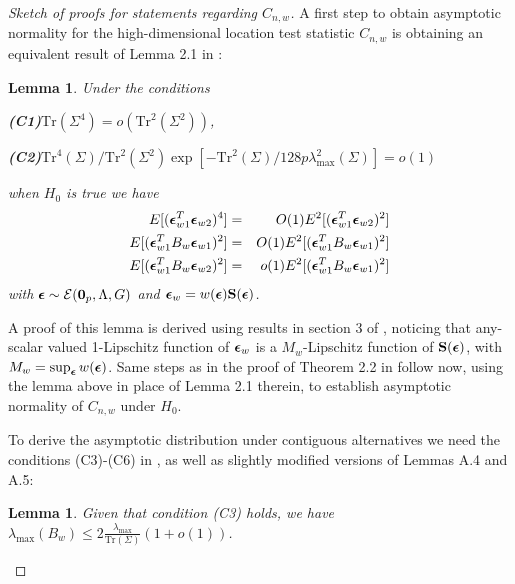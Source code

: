 \documentclass[12pt,letterpaper]{article}
\newtheorem{Lemma}[Theorem]{Lemma}
\theoremstyle{definition} \newtheorem{Definition}[Theorem]{Definition}
\begin{document}
\begin{proof}[Sketch of proofs for statements regarding $C_{n,w}$]

A first step to obtain asymptotic normality for the high-dimensional location test statistic $C_{n,w}$ is obtaining an equivalent result of Lemma 2.1 in \cite{WangPengLi15}:

\begin{Lemma}\label{Lemma:HDlemma21} Under the conditions

\noindent\textbf{(C1)}$\text{Tr}(\Sigma^4) = o(\text{Tr}^2(\Sigma^2)) $,

\noindent\textbf{(C2)}$\text{Tr}^4(\Sigma) / \text{Tr}^2(\Sigma^2) \exp[ - \text{Tr}^2(\Sigma) / 128p \lambda^2_{\max}(\Sigma) ] = o(1)$
\vspace{1em}

\noindent when $H_0$ is true we have
%
\begin{eqnarray}
E[ ({\boldsymbol{\epsilon}}_{w1}^T {\boldsymbol{\epsilon}}_{w2})^4 ] &=& O(1) E^2[ ({\boldsymbol{\epsilon}}_{w1}^T {\boldsymbol{\epsilon}}_{w2})^2 ]\\
E[ ({\boldsymbol{\epsilon}}_{w1}^T B_w {\boldsymbol{\epsilon}}_{w1})^2 ] &=& O(1) E^2[ ({\boldsymbol{\epsilon}}_{w1}^T B_w {\boldsymbol{\epsilon}}_{w1})^2 ]\\
E[ ({\boldsymbol{\epsilon}}_{w1}^T B_w {\boldsymbol{\epsilon}}_{w2})^2 ] &=& o(1) E^2[ ({\boldsymbol{\epsilon}}_{w1}^T B_w {\boldsymbol{\epsilon}}_{w1})^2 ]
\end{eqnarray}
%
with ${\boldsymbol{\epsilon}} \sim \mathcal E({\bf 0}_p, \Lambda, G)$ and ${\boldsymbol{\epsilon}}_w = w({\boldsymbol{\epsilon}}) {\mathbf{S}}({\boldsymbol{\epsilon}})$.
\end{Lemma}
%
A proof of this lemma is derived using results in section 3 of \cite{ElKaroui09}, noticing that any-scalar valued 1-Lipschitz function of ${\boldsymbol{\epsilon}}_w$ is a $M_w$-Lipschitz function of ${\mathbf{S}}({\boldsymbol{\epsilon}})$, with $M_w = \sup_{\boldsymbol{\epsilon}} w({\boldsymbol{\epsilon}})$. Same steps as in the proof of Theorem 2.2 in \cite{WangPengLi15} follow now, using the lemma above in place of Lemma 2.1 therein, to establish asymptotic normality of $C_{n,w}$ under $H_0$.

To derive the asymptotic distribution under contiguous alternatives we need the conditions (C3)-(C6) in \cite{WangPengLi15}, as well as slightly modified versions of Lemmas A.4 and A.5:

\begin{Lemma}
Given that condition (C3) holds, we have $\lambda_{\max} (B_w) \leq 2 \frac{\lambda_{\max}}{\text{Tr} (\Sigma)} (1+o(1))$.
\end{Lemma}


\end{proof}
\end{document}

